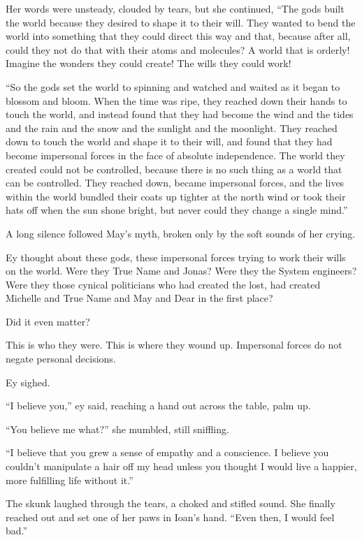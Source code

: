 Her words were unsteady, clouded by tears, but she continued, ``The gods built the world because they desired to shape it to their will. They wanted to bend the world into something that they could direct this way and that, because after all, could they not do that with their atoms and molecules? A world that is orderly! Imagine the wonders they could create! The wills they could work!

``So the gods set the world to spinning and watched and waited as it began to blossom and bloom. When the time was ripe, they reached down their hands to touch the world, and instead found that they had become the wind and the tides and the rain and the snow and the sunlight and the moonlight. They reached down to touch the world and shape it to their will, and found that they had become impersonal forces in the face of absolute independence. The world they created could not be controlled, because there is no such thing as a world that can be controlled. They reached down, became impersonal forces, and the lives within the world bundled their coats up tighter at the north wind or took their hats off when the sun shone bright, but never could they change a single mind.''

A long silence followed May's myth, broken only by the soft sounds of her crying.

Ey thought about these gods, these impersonal forces trying to work their wills on the world. Were they True Name and Jonas? Were they the System engineers? Were they those cynical politicians who had created the lost, had created Michelle and True Name and May and Dear in the first place?

Did it even matter?

This is who they were. This is where they wound up. Impersonal forces do not negate personal decisions.

Ey sighed.

``I believe you,'' ey said, reaching a hand out across the table, palm up.

``You believe me what?'' she mumbled, still sniffling.

``I believe that you grew a sense of empathy and a conscience. I believe you couldn't manipulate a hair off my head unless you thought I would live a happier, more fulfilling life without it.''

The skunk laughed through the tears, a choked and stifled sound. She finally reached out and set one of her paws in Ioan's hand. ``Even then, I would feel bad.''

